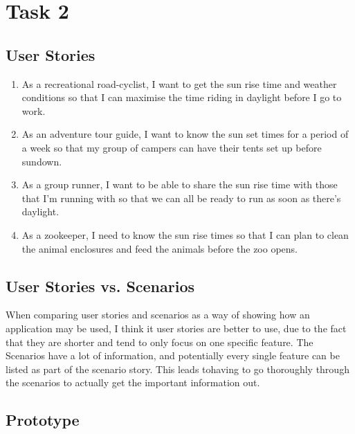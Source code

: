 \documentclass[11pt,english,numbers=endperiod,parskip=half]{scrartcl}
\begin{document}
\section{Task 2}
\subsection{User Stories}
\begin{enumerate}
	\item{As a recreational road-cyclist, I want to get the sun rise time and
	weather conditions so that I can maximise the time riding in daylight before
	I go to work.}
	\item{As an adventure tour guide, I want to know the sun set times for a
	period of a week so that my group of campers can have their tents set up
	before sundown.}
	\item{As a group runner, I want to be able to share the sun rise time with
	those that I'm running with so that we can all be ready to run as soon as
	there's daylight.}
	\item{As a zookeeper, I need to know the sun rise times so that I can plan
	to clean the animal enclosures and feed the animals before the zoo opens.}
\end{enumerate}
\subsection{User Stories vs. Scenarios}
When comparing user stories and scenarios as a way of showing how an application
 may be used, I think it user stories are better to use, due to the fact that
they are shorter and tend to only focus on one specific feature. The Scenarios
have a lot of information, and potentially every single feature can be listed as
 part of the scenario story. This leads tohaving to go thoroughly through the
scenarios to actually get the important information out.
\subsection{Prototype}
\end{document}
